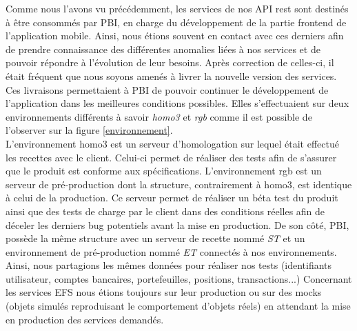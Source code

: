 	Comme nous l'avons vu précédemment, les services de nos API rest sont destinés à être consommés par PBI, en charge du développement de la partie frontend de l'application mobile. Ainsi, nous étions souvent en contact avec ces derniers afin de prendre connaissance des différentes anomalies liées à nos services et de pouvoir répondre à l'évolution de leur besoins. Après correction de celles-ci, il était fréquent que nous soyons amenés à livrer la nouvelle version des services. Ces livraisons permettaient à PBI de pouvoir continuer le développement de l'application dans les meilleures conditions possibles. Elles s'effectuaient sur deux environnements différents à savoir \textit{homo3} et \textit{rgb} comme il est possible de l'observer sur la figure \ref{environnement}. \\
	
	L'environnement homo3 est un serveur d'homologation sur lequel était effectué les recettes avec le client. Celui-ci permet de réaliser des tests afin de s'assurer que le produit est conforme aux spécifications. L'environnement rgb est un serveur de pré-production dont la structure, contrairement à homo3, est identique à celui de la production. Ce serveur permet de réaliser un béta test du produit ainsi que des tests de charge par le client dans des conditions réelles afin de déceler les derniers bug potentiels avant la mise en production. De son côté, PBI, possède la même structure avec un serveur de recette nommé \textit{ST} et un environnement de pré-production nommé \textit{ET} connectés à nos environnements. Ainsi, nous partagions les mêmes données pour réaliser nos tests (identifiants utilisateur, comptes bancaires, portefeuilles, positions, transactions...) Concernant les services EFS nous étions toujours sur leur production ou sur des mocks (objets simulés reproduisant le comportement d’objets réels) en attendant la mise en production des services demandés.\\
	

